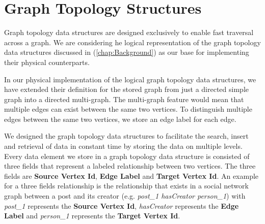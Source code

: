 {\section{Graph Topology Structures}
\label{GraphTopolgyImp}

Graph topology data structures are designed exclusively to enable fast traversal across a graph. We are considering he logical representation of the graph topology data structures discussed in (\ref{chap:Background}) as our base for implementing their physical counterparts. 

In our physical implementation of the logical graph topology data structures, we have extended their definition for the stored graph from just a directed simple graph into a directed multi-graph. The multi-graph feature would mean that multiple edges can exist between the same two vertices. To distinguish multiple edges between the same two vertices, we store an edge label for each edge.



We designed the graph topology data structures to facilitate the search, insert and retrieval of data in constant time by storing the data on multiple levels. Every data element we store in a graph topology data structure is consisted of three fields that represent a labeled relationship between two vertices. The three fields are \textbf{Source Vertex Id}, \textbf{Edge Label} and \textbf{Target Vertex Id}. An example for a three fields relationship is the relationship that exists in a social network graph between a post and its creator (e.g. \textit{post\_1 hasCreator person\_1}) with \textit{post\_1} represents the \textbf{Source Vertex Id}, \textit{hasCreator} represents the \textbf{Edge Label} and \textit{person\_1} represents the \textbf{Target Vertex Id}.

}

